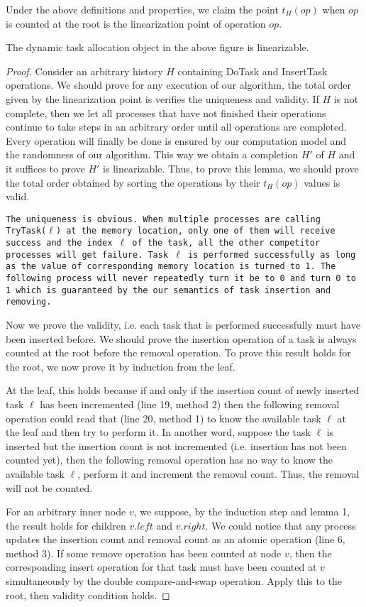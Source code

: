 Under the above definitions and properties, we claim the point $t_H(op)$ when $op$ is counted at the root is the linearization point of operation $op$.

\begin{lem}
The dynamic task allocation object in the above figure is linearizable.
\end{lem}
\begin{proof}
Consider an arbitrary history $H$ containing DoTask and InsertTask operations. We should prove for any execution of our algorithm, the total order given by the linearization point is verifies the uniqueness and validity. If $H$ is not complete, then we let all processes that have not finished their operations continue to take steps in an arbitrary order until all operations are completed. Every operation will finally be done is ensured by our computation model and the randomness of our algorithm. This way we obtain a completion $H'$ of $H$ and it suffices to prove $H'$ is linearizable. Thus, to prove this lemma, we should prove the total order obtained by sorting the operations by their $t_H(op)$ values is valid.

\texttt{The uniqueness is obvious. When multiple processes are calling TryTask($\ell$) at the memory location, only one of them will receive success and the index $\ell$ of the task, all the other competitor processes will get failure. Task $\ell$ is performed successfully as long as the value of corresponding memory location is turned to 1. The following process will never repeatedly turn it be to 0 and turn 0 to 1 which is guaranteed by the our semantics of task insertion and removing.}

Now we prove the validity, i.e. each task that is performed successfully must have been inserted before. We should prove the insertion operation of a task is always counted at the root before the removal operation. To prove this result holds for the root, we now prove it by induction from the leaf.

At the leaf, this holds because if and only if the insertion count of newly inserted task $\ell$ has been incremented (line 19, method 2) then the following removal operation could read that (line 20, method 1) to know the available task $\ell$ at the leaf and then try to perform it. In another word, suppose the task $\ell$ is inserted but the insertion count is not incremented (i.e. insertion has not been counted yet), then the following removal operation has no way to know the available task $\ell$, perform it and increment the removal count. Thus, the removal will not be counted.

For an arbitrary inner node $v$, we suppose, by the induction step and lemma 1, the result holds for children $v.left$ and $v.right$. We could notice that any process updates the insertion count and removal count as an atomic operation (line 6, method 3). If some remove operation has been counted at node $v$, then the corresponding insert operation for that task must have been counted at $v$ simultaneously by the double compare-and-swap operation. Apply this to the root, then validity condition holds.
\end{proof}


